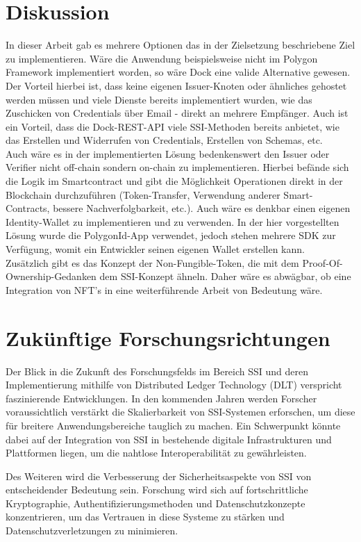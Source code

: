 \section{Diskussion}
In dieser Arbeit gab es mehrere Optionen das in der Zielsetzung beschriebene Ziel zu implementieren. Wäre die Anwendung beispielsweise nicht im Polygon Framework implementiert worden, so wäre Dock eine valide Alternative gewesen. Der Vorteil hierbei ist, dass keine eigenen Issuer-Knoten oder ähnliches gehostet werden müssen und viele Dienste bereits implementiert wurden, wie das Zuschicken von Credentials über Email - direkt an mehrere Empfänger. Auch ist ein Vorteil, dass die Dock-REST-API viele SSI-Methoden bereits anbietet, wie das Erstellen und Widerrufen von Credentials, Erstellen von Schemas, etc.\\
Auch wäre es in der implementierten Lösung bedenkenswert den Issuer oder Verifier nicht off-chain sondern on-chain zu implementieren. Hierbei befände sich die Logik im Smartcontract und gibt die Möglichkeit Operationen direkt in der Blockchain durchzuführen (Token-Transfer, Verwendung anderer Smart-Contracts, bessere Nachverfolgbarkeit, etc.). Auch wäre es denkbar einen eigenen Identity-Wallet zu implementieren und zu verwenden. In der hier vorgestellten Lösung wurde die PolygonId-App verwendet, jedoch stehen mehrere SDK zur Verfügung, womit ein Entwickler seinen eigenen Wallet erstellen kann.\\
Zusätzlich gibt es das Konzept der Non-Fungible-Token, die mit dem Proof-Of-Ownership-Gedanken dem SSI-Konzept ähneln. Daher wäre es abwägbar, ob eine Integration von NFT's in eine weiterführende Arbeit von Bedeutung wäre.


\section{Zukünftige Forschungsrichtungen}
Der Blick in die Zukunft des Forschungsfelds im Bereich SSI und deren Implementierung mithilfe von Distributed Ledger Technology (DLT) verspricht faszinierende Entwicklungen. In den kommenden Jahren werden Forscher voraussichtlich verstärkt die Skalierbarkeit von SSI-Systemen erforschen, um diese für breitere Anwendungsbereiche tauglich zu machen. Ein Schwerpunkt könnte dabei auf der Integration von SSI in bestehende digitale Infrastrukturen und Plattformen liegen, um die nahtlose Interoperabilität zu gewährleisten.

Des Weiteren wird die Verbesserung der Sicherheitsaspekte von SSI von entscheidender Bedeutung sein. Forschung wird sich auf fortschrittliche Kryptographie, Authentifizierungsmethoden und Datenschutzkonzepte konzentrieren, um das Vertrauen in diese Systeme zu stärken und Datenschutzverletzungen zu minimieren.

